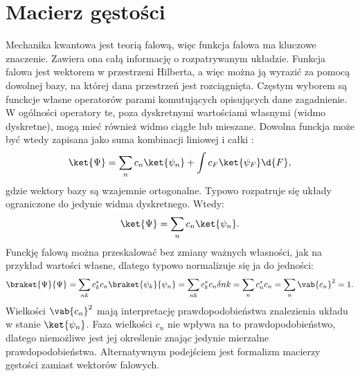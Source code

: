 
\section{Macierz gęstości}
Mechanika kwantowa jest teorią falową, więc funkcja falowa ma kluczowe znaczenie. Zawiera ona całą informację o rozpatrywanym układzie. Funkcja falowa jest wektorem w przestrzeni Hilberta, a więc można ją wyrazić za pomocą dowolnej bazy, na której dana przestrzeń jest rozciągnięta. Częstym wyborem są funckcje własne operatorów parami komutujących opisujących dane zagadnienie. W ogólności operatory te, poza dyskretnymi wartościami własnymi (widmo dyskretne), mogą mieć również widmo ciągłe lub mieszane. Dowolna funckja może być wtedy zapisana jako suma kombinacji liniowej i całki \cite{davydov_mechanika_kwantowa}:
\begin{equation}\label{eq:funkcja_falowa_w_bazie_ogolna}
	\ket{\Psi} = \sum_{n} c_{n} \ket{\psi_{n}} + \int c_{F} \ket{\psi_{F}} \d{F},
\end{equation}
gdzie wektory bazy są wzajemnie ortogonalne. Typowo rozpatruje się układy ograniczone do jedynie widma dyskretnego. Wtedy:
\begin{equation}\label{eq:funkcja_falowa_w_bazie_dyskretna}
	\ket{\Psi} = \sum_{n} c_{n} \ket{\psi_{n}}.
\end{equation}
Funckję falową można przeskalować bez zmiany ważnych własności, jak na przykład wartości własne, dlatego typowo normalizuje się ja do jedności:
\begin{equation}\label{eq:funkcja_falowa_normalizacja}
	\braket{\Psi}{\Psi} = 
	\sum_{nk} c_{k}^{*}c_{n} \braket{\psi_{k}}{\psi_{n}} = 
	\sum_{nk} c_{k}^{*}c_{n} \delta{nk} = 
	\sum_{n} c_{n}^{*}c_{n} = 
	\sum_{n} \vab{c_{n}}^2 = 1.
\end{equation}
Wielkości \(\vab{c_{n}}^2\) mają interpretację prawdopodobieństwa znalezienia układu w stanie \(\ket{\psi_{n}}\). Faza wielkości \(c_{n}\) nie wpływa na to prawdopodobieństwo, dlatego niemożliwe jest jej określenie znając jedynie mierzalne prawdopodobieństwa. Alternatywnym podejściem jest formalizm macierzy gęstości zamiast wektorów falowych. 

